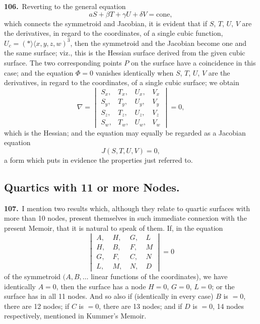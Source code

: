 \documentclass[11pt,a4paper]{article}
\newcommand{\bw}{\mathrel{\rangle\!\langle}}
\begin{document}
\noindent\textbf{106.}\ Reverting to the general equation
\[
aS + \beta T + \gamma U + \delta V = \text{cone},
\]
which connects the symmetroid and Jacobian, it is evident that if $S$, $T$, $U$, $V$ are the derivatives, in regard to the coordinates, of a single cubic function, $U_c = (\ast\bw x, y, z, w)^3$, then the symmetroid and the Jacobian become one and the same surface; viz., this is the Hessian surface derived from the given cubic surface. The two corresponding points $P$ on the surface have a coincidence in this case; and the equation $\Phi = 0$ vanishes identically when $S$, $T$, $U$, $V$ are the derivatives, in regard to the coordinates, of a single cubic surface; we obtain
\[
\nabla = \begin{vmatrix}
S_x, & T_x, & U_x, & V_x\\
S_y, & T_y, & U_y, & V_y\\
S_z, & T_z, & U_z, & V_z\\
S_w, & T_w, & U_w, & V_w
\end{vmatrix} = 0,
\]
which is the Hessian; and the equation may equally be regarded as a Jacobian equation
\[
J(S, T, U, V) = 0,
\]
a form which puts in evidence the properties just referred to.

\newpage
\setcounter{page}{176}

\subsection*{Quartics with 11 or more Nodes.}

\noindent\textbf{107.}\ I mention two results which, although they relate to quartic surfaces with more than 10 nodes, present themselves in such immediate connexion with the present Memoir, that it is natural to speak of them. If, in the equation
\[
\begin{vmatrix}
A,\ & H,\ & G,\ & L\\
H,\ & B,\ & F,\ & M\\
G,\ & F,\ & C,\ & N\\
L,\ & M,\ & N,\ & D
\end{vmatrix} = 0
\]
of the symmetroid $(A, B, \ldots$ linear functions of the coordinates), we have identically $A = 0$, then the surface has a node $H = 0$, $G = 0$, $L = 0$; or the surface has in all 11 nodes. And so also if (identically in every case) $B$ is $= 0$, there are 12 nodes; if $C$ is $= 0$, there are 13 nodes; and if $D$ is $= 0$, 14 nodes respectively, mentioned in Kummer's Memoir.

\medskip
\end{document}
